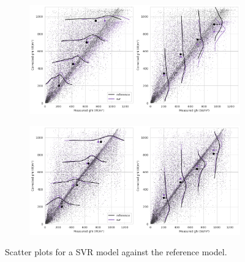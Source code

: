 \begin{figure}[htb!]
    \begin{subfigure}{\columnwidth}
        \includegraphics[width=\columnwidth]{figures/first_study/scatter_plot_svr_site3_mae.png}
    \end{subfigure}
\medskip
    \begin{subfigure}{\columnwidth}
        \includegraphics[width=\columnwidth]{figures/first_study/scatter_plot_svr_site4_mae.png}
    \end{subfigure}
    \caption[]{Scatter plots for a SVR model against the reference model.}
\end{figure}
